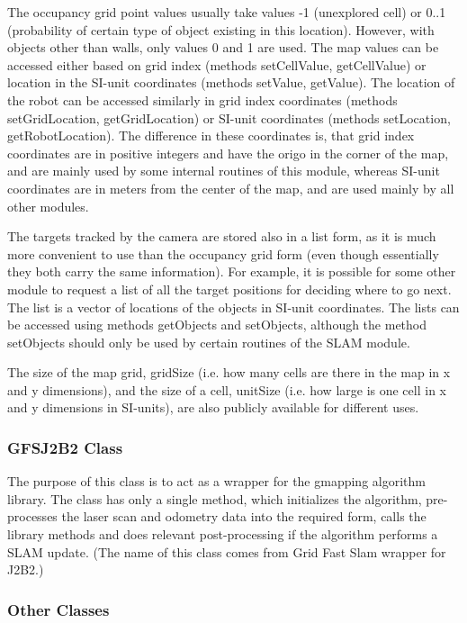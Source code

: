 \documentclass[a4paper,10pt]{article}
\begin{document}
The occupancy grid point values usually take values -1 (unexplored cell) or 0..1 (probability of certain type of object existing in this location). However, with objects other than walls, only values 0 and 1 are used. The map values can be accessed either based on grid index (methods setCellValue, getCellValue) or location in the SI-unit coordinates (methods setValue, getValue). The location of the robot can be accessed similarly in grid index coordinates (methods setGridLocation, getGridLocation) or SI-unit coordinates (methods setLocation, getRobotLocation). The difference in these coordinates is, that grid index coordinates are in positive integers and have the origo in the corner of the map, and are mainly used by some internal routines of this module, whereas SI-unit coordinates are in meters from the center of the map, and are used mainly by all other modules.

The targets tracked by the camera are stored also in a list form, as it is much more convenient to use than the occupancy grid form (even though essentially they both carry the same information). For example, it is possible for some other module to request a list of all the target positions for deciding where to go next. The list is a vector of locations of the objects in SI-unit coordinates. The lists can be accessed using methods getObjects and setObjects, although the method setObjects should only be used by certain routines of the SLAM module.

The size of the map grid, gridSize (i.e. how many cells are there in the map in x and y dimensions), and the size of a cell, unitSize (i.e. how large is one cell in x and y dimensions in SI-units), are also publicly available for different uses.

\subsubsection{GFSJ2B2 Class}

The purpose of this class is to act as a wrapper for the gmapping algorithm library. The class has only a single method, which initializes the algorithm, pre-processes the laser scan and odometry data into the required form, calls the library methods and does relevant post-processing if the algorithm performs a SLAM update. (The name of this class comes from Grid Fast Slam wrapper for J2B2.)

\subsubsection{Other Classes}
\end{document}
